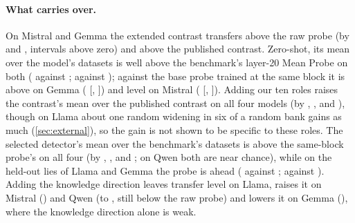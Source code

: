 \paragraph{What carries over.} On Mistral and Gemma the extended contrast transfers above the raw probe
(by  and , intervals above zero) and above
the published contrast. Zero-shot, its mean over the model's datasets is well above the benchmark's
layer-20 Mean Probe on both ( against ;
 against ); against the base probe trained at the same block
it is above on Gemma ( [, ])
and level on Mistral ( [,
]). Adding our ten roles raises the contrast's mean over the published
contrast on all four models (by , ,
 and ), though on Llama about one random
widening in six of a random bank gains as much (\cref{sec:external}), so the gain is not shown to be
specific to these roles. The selected detector's mean over the benchmark's datasets is above the same-block
probe's on all four (by , ,
 and ; on Qwen both are near chance), while
on the held-out lies of Llama and Gemma the probe is ahead ( against ;
 against ). Adding the knowledge direction leaves transfer
level on Llama, raises it on Mistral () and Qwen (to ,
still below the raw probe) and lowers it on Gemma (), where the knowledge
direction alone is weak.

